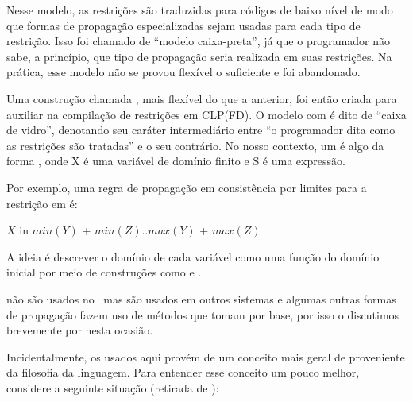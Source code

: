 \documentclass{article}
\begin{document}
Nesse modelo, as restrições são traduzidas para códigos de baixo nível de modo que formas de propagação especializadas sejam
usadas para cada tipo de restrição. Isso foi chamado de ``modelo caixa-preta'', já que o programador não sabe,
a princípio, que tipo de propagação seria realizada em suas restrições. Na prática, esse modelo não se provou flexível o suficiente
e foi abandonado.

Uma construção chamada , mais flexível do que a anterior, foi então criada para auxiliar na compilação de
restrições em CLP(FD). O modelo com  é dito de ``caixa de vidro'', denotando seu caráter intermediário entre
``o programador dita como as restrições são tratadas'' e o seu contrário. No nosso contexto, um
 é algo da forma , onde X é uma variável de domínio finito e S é uma expressão.

Por exemplo, uma regra de propagação em consistência por limites para a restrição 
em  é:

    $X$ in $min(Y)$ + $min(Z)..max(Y)$ + $max(Z)$

A ideia é descrever o domínio de cada variável como uma função do domínio inicial por meio de
construções como  e .

 não são usados no \eclipse\, mas são usados em outros sistemas e algumas outras formas de propagação fazem
uso de métodos que tomam  por base, por isso o discutimos brevemente por nesta ocasião.

Incidentalmente, os  usados aqui provém de um conceito mais geral de
 proveniente da filosofia da linguagem.
Para entender esse conceito um pouco melhor, considere a seguinte situação (retirada de \cite{raymond}):
\end{document}
